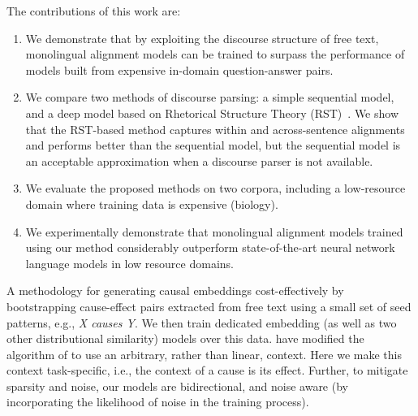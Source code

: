 \address{Robustness - shallower, no structure, learned representations (EMNLP2017-hopeful)}



The contributions of this work are:
\begin{enumerate}

\item We demonstrate that by exploiting the discourse structure of free text, monolingual alignment models can be trained to surpass the performance of models built from expensive in-domain question-answer pairs. 

\item We compare two methods of discourse parsing: a simple sequential model, and a deep model based on Rhetorical Structure Theory (RST)~\cite{mann88}.  We show that the RST-based method captures within and across-sentence alignments and performs better than the sequential model, but the sequential model is an acceptable approximation when a discourse parser is not available.  

\item We evaluate the proposed methods on two corpora, including a low-resource domain where training data is expensive (biology).

\item We experimentally demonstrate that monolingual alignment models trained using our method considerably outperform state-of-the-art neural network language models in low resource domains.
\end{enumerate}

{} 
A methodology for generating causal embeddings cost-effectively by bootstrapping cause-effect pairs extracted from free text using a small set of seed patterns, e.g., {\em X causes Y}. 
We then train dedicated embedding (as well as two other distributional similarity) models over this data. \citet{levy2014dependency} have modified the algorithm of\citet{mikolov2013distributed} to use an arbitrary, rather than linear, context. Here we make this context task-specific, i.e., the context of a cause is its effect.
Further, to mitigate sparsity and noise, our models are bidirectional, and noise aware (by incorporating the likelihood of noise in the training process). 

